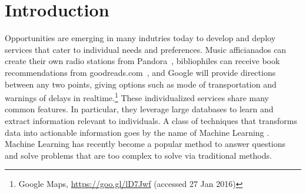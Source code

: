 \documentclass[10pt,letterpaper]{article}
\begin{document}
\section*{Introduction}
\label{sec:introduction}


Opportunities are emerging in many indutries today to develop and deploy services that cater to individual needs and preferences. Music afficianados can create their own radio stations from Pandora~\cite{pandora}, bibliophiles can receive 
book recommendations from goodreads.com~\cite{goodreads}, and Google will provide directions between any two points, giving options such as mode of transportation and warnings of delays in realtime.\footnote{Google Maps, \url{https://goo.gl/lD7Jwf} (accessed 27 Jan 2016)}
These individualized services share many common features. In particular, they leverage large databases to learn and extract information relevant to individuals.  
A class of techniques that transforms data into actionable information goes by the name of Machine Learning \cite{pythonmachinelearning}.
Machine Learning has recently become a popular method to answer questions and solve problems that are too complex to solve via traditional methods. 
\end{document}
